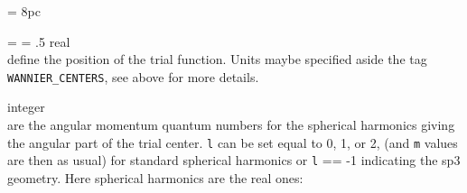 \newdimen\descindent \descindent = 8pc
{\noindent \leftskip = \descindent \parskip = .5\baselineskip
{}%
{\sc real} \\ define the position of the trial function. Units maybe specified aside
            the tag {\tt WANNIER\_CENTERS}, see above for more details. \par

\noindent{}%
{\sc integer} \\ are the angular momentum quantum numbers for the spherical harmonics
giving the angular part of the trial center. {\tt l} can be set equal to 0, 1, or 2,
(and {\tt m} values are then as usual) for standard spherical harmonics or {\tt l} == -1
indicating the sp3 geometry. Here spherical harmonics are the real ones:\\

}
